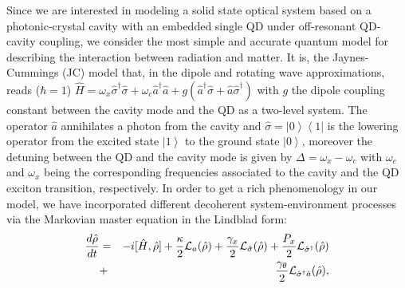 \documentclass[aps,prl,showpacs,twocolumn]{revtex4}
\newcommand{\ket}[1]{\left| #1 \right>} %
\newcommand{\bra}[1]{\left< #1 \right|} %
\begin{document}
Since we are interested in modeling a solid state optical system based on a photonic-crystal cavity with an embedded single QD under off-resonant QD-cavity coupling, we consider the most simple and accurate quantum model for describing the interaction between radiation and matter. It is, the Jaynes-Cummings (JC) model that, in the dipole and rotating wave approximations, reads ($\hbar=1$) $\hat{H}=\omega_{x}\hat{\sigma}^{\dag}\hat{\sigma}+\omega_c\hat{a}^{\dag}\hat{a}+g(\hat{a}^\dag\hat{\sigma}+\hat{a}\hat{\sigma}^\dag)$ with $g$ the dipole coupling constant between the cavity mode and the QD as a two-level system. The operator $\hat{a}$ annihilates a photon from the cavity and $\hat{\sigma}=\ket{0}\bra{1}$ is the lowering operator from the excited state $\ket{1}$ to the ground state $\ket{0}$, moreover the detuning between the QD and the cavity mode is given by $\Delta=\omega_{x}-\omega_c$ with $\omega_{c}$ and $\omega_{x}$ being the corresponding frequencies associated to the cavity and the QD exciton transition, respectively. In order to get a rich phenomenology in our model, we have incorporated different decoherent system-environment processes via the Markovian master equation in the Lindblad form:
%
\begin{eqnarray}\label{eq1}
\frac{d\hat{\rho}}{dt}&=&-i[\hat{H},\hat{\rho}]+\frac{\kappa}{2}\mathcal{L}_{a}(\hat{\rho})+\frac{\gamma_{x}}{2}\mathcal{L}_{\hat{\sigma}}(\hat{\rho})+\frac{P_{x}}{2}\mathcal{L}_{\hat{\sigma}^{\dagger}}(\hat{\rho})\notag \\ &+&\frac{\gamma_{\theta}}{2}\mathcal{L}_{\hat{\sigma}^{\dagger}\hat{a}}(\hat{\rho}),
\end{eqnarray}
\end{document}
